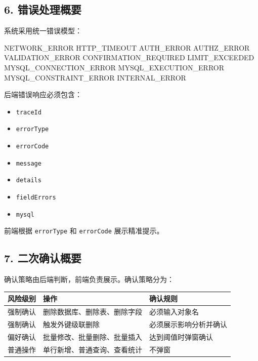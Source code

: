 \documentclass[
  a4paper,
  UTF8]{ctexart}
\newenvironment{Shaded}{}{}
\newcommand{\NormalTok}[1]{#1}
\providecommand{\tightlist}{%
  \setlength{\itemsep}{0pt}\setlength{\parskip}{0pt}}
\begin{document}
\hypertarget{ux9519ux8befux5904ux7406ux6982ux8981}{%
\subsection{6.
错误处理概要}\label{ux9519ux8befux5904ux7406ux6982ux8981}}

系统采用统一错误模型：

\begin{Shaded}
\begin{Highlighting}[]
\NormalTok{NETWORK\_ERROR}
\NormalTok{HTTP\_TIMEOUT}
\NormalTok{AUTH\_ERROR}
\NormalTok{AUTHZ\_ERROR}
\NormalTok{VALIDATION\_ERROR}
\NormalTok{CONFIRMATION\_REQUIRED}
\NormalTok{LIMIT\_EXCEEDED}
\NormalTok{MYSQL\_CONNECTION\_ERROR}
\NormalTok{MYSQL\_EXECUTION\_ERROR}
\NormalTok{MYSQL\_CONSTRAINT\_ERROR}
\NormalTok{INTERNAL\_ERROR}
\end{Highlighting}
\end{Shaded}

后端错误响应必须包含：

\begin{itemize}
\tightlist
\item
  \texttt{traceId}
\item
  \texttt{errorType}
\item
  \texttt{errorCode}
\item
  \texttt{message}
\item
  \texttt{details}
\item
  \texttt{fieldErrors}
\item
  \texttt{mysql}
\end{itemize}

前端根据 \texttt{errorType} 和 \texttt{errorCode} 展示精准提示。

\hypertarget{ux4e8cux6b21ux786eux8ba4ux6982ux8981}{%
\subsection{7.
二次确认概要}\label{ux4e8cux6b21ux786eux8ba4ux6982ux8981}}

确认策略由后端判断，前端负责展示。确认策略分为：

\begin{longtable}[]{@{}lll@{}}
\toprule
风险级别 & 操作 & 确认规则 \\
\midrule
\endhead
强制确认 & 删除数据库、删除表、删除字段 & 必须输入对象名 \\
强制确认 & 触发外键级联删除 & 必须展示影响分析并确认 \\
偏好确认 & 批量修改、批量删除、批量插入 & 达到阈值时弹窗确认 \\
普通操作 & 单行新增、普通查询、查看统计 & 不弹窗 \\
\bottomrule
\end{longtable}
\end{document}
